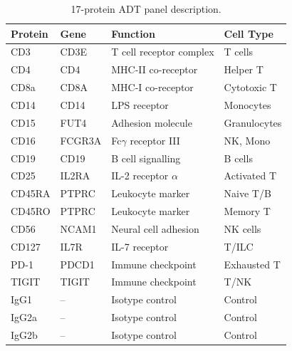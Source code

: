 \documentclass[11pt,a4paper]{article}
\begin{document}
\begin{table}[!ht]
\centering
\caption{17-protein ADT panel description.}
\label{tab:proteins}
\scriptsize
\begin{tabular}{llp{2.8cm}l}
\toprule
\textbf{Protein} & \textbf{Gene} & \textbf{Function} & \textbf{Cell Type} \\
\midrule
CD3   & CD3E  & T cell receptor complex & T cells \\
CD4   & CD4   & MHC-II co-receptor     & Helper T \\
CD8a  & CD8A  & MHC-I co-receptor      & Cytotoxic T \\
CD14  & CD14  & LPS receptor           & Monocytes \\
CD15  & FUT4  & Adhesion molecule      & Granulocytes \\
CD16  & FCGR3A & Fc$\gamma$ receptor III & NK, Mono \\
CD19  & CD19  & B cell signalling      & B cells \\
CD25  & IL2RA & IL-2 receptor $\alpha$ & Activated T \\
CD45RA & PTPRC & Leukocyte marker      & Naive T/B \\
CD45RO & PTPRC & Leukocyte marker      & Memory T \\
CD56  & NCAM1 & Neural cell adhesion   & NK cells \\
CD127 & IL7R  & IL-7 receptor          & T/ILC \\
PD-1  & PDCD1 & Immune checkpoint      & Exhausted T \\
TIGIT & TIGIT & Immune checkpoint      & T/NK \\
IgG1  & --    & Isotype control        & Control \\
IgG2a & --    & Isotype control        & Control \\
IgG2b & --    & Isotype control        & Control \\
\bottomrule
\end{tabular}
\end{table}
\end{document}
